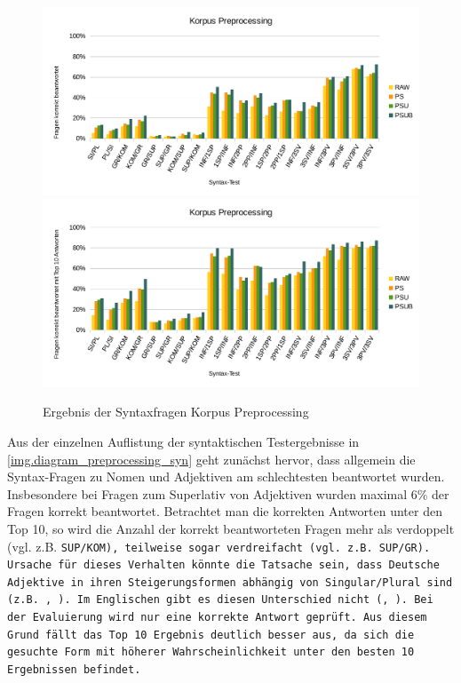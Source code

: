 \begin{figure}[!ht]
\begin{adjustwidth}{-4mm}{-4mm}
\centering
{}
{\includegraphics[width=1.04\textwidth]{images/diagram_preprocessing_correct_syn}}
{\includegraphics[width=1.04\textwidth]{images/diagram_preprocessing_top10_syn}}
\caption[Ergebnis der Syntaxfragen Korpus Preprocessing]{Ergebnis der Syntaxfragen Korpus Preprocessing}\label{img.diagram_preprocessing_syn}
\end{adjustwidth}
\end{figure}

Aus der einzelnen Auflistung der syntaktischen Testergebnisse in \autoref{img.diagram_preprocessing_syn} geht zunächst hervor, dass allgemein die Syntax-Fragen zu Nomen und Adjektiven am schlechtesten beantwortet wurden. Insbesondere bei Fragen zum Superlativ von Adjektiven wurden maximal 6\% der Fragen korrekt beantwortet. Betrachtet man die korrekten Antworten unter den Top 10, so wird die Anzahl der korrekt beantworteten Fragen mehr als verdoppelt (vgl. z.B. \tt{SUP/KOM}), teilweise sogar verdreifacht (vgl. z.B. \tt{SUP/GR}). Ursache für dieses Verhalten könnte die Tatsache sein, dass Deutsche Adjektive in ihren Steigerungsformen abhängig von Singular/Plural sind (z.B. , ). Im Englischen gibt es diesen Unterschied nicht (, ). Bei der Evaluierung wird nur eine korrekte Antwort geprüft. Aus diesem Grund fällt das Top 10 Ergebnis deutlich besser aus, da sich die gesuchte Form mit höherer Wahrscheinlichkeit unter den besten 10 Ergebnissen befindet.

